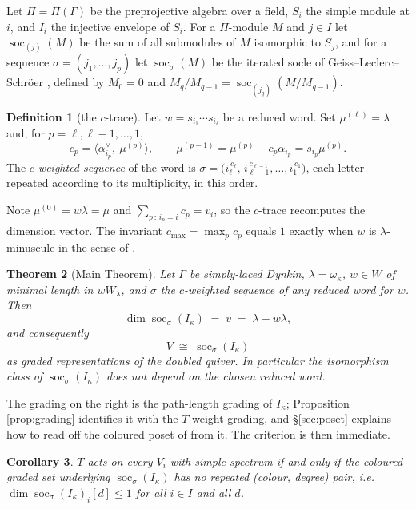 \documentclass[11pt,reqno]{amsart}
\theoremstyle{plain}
\newtheorem{theorem}{Theorem}[section]
\newtheorem{corollary}[theorem]{Corollary}
\theoremstyle{definition}
\newtheorem{definition}[theorem]{Definition}
\DeclareMathOperator{\soc}{soc}
\newcommand{\Pia}{\Pi}
\newcommand{\dimv}{\underline{\dim}}
\newcommand{\al}{\alpha}
\newcommand{\om}{\omega}
\newcommand{\la}{\lambda}
\newcommand{\ka}{\kappa}
\begin{document}
Let $\Pia=\Pia(\Gamma)$ be the preprojective algebra over a field, $S_i$ the
simple module at $i$, and $I_i$ the injective envelope of $S_i$.  For a
$\Pia$-module $M$ and $j\in I$ let $\soc_{(j)}(M)$ be the sum of all submodules
of $M$ isomorphic to $S_j$, and for a sequence $\sigma=(j_1,\dots,j_p)$ let
$\soc_\sigma(M)$ be the iterated socle of Geiss--Leclerc--Schr\"oer
\cite[\S2.4]{GLS}, defined by $M_0=0$ and
$M_q/M_{q-1}=\soc_{(j_q)}(M/M_{q-1})$.

\begin{definition}[the $c$-trace]\label{def:ctrace}
Let $w=s_{i_1}\cdots s_{i_\ell}$ be a reduced word.  Set $\mu^{(\ell)}=\la$ and,
for $p=\ell,\ell-1,\dots,1$,
\[
  c_p=\langle \al_{i_p}^\vee,\ \mu^{(p)}\rangle,
  \qquad
  \mu^{(p-1)}=\mu^{(p)}-c_p\al_{i_p}=s_{i_p}\mu^{(p)} .
\]
The \emph{$c$-weighted sequence} of the word is
$\sigma=\bigl(i_\ell^{\,c_\ell},\,i_{\ell-1}^{\,c_{\ell-1}},\dots,
i_1^{\,c_1}\bigr)$, each letter repeated according to its multiplicity, in
this order.
\end{definition}

Note $\mu^{(0)}=w\la=\mu$ and $\sum_{p\,:\,i_p=i}c_p=v_i$, so the $c$-trace
recomputes the dimension vector.  The invariant $c_{\max}=\max_p c_p$ equals
$1$ exactly when $w$ is $\la$-minuscule in the sense of
\cite[Def.~5.1]{DKK}.

\begin{theorem}[Main Theorem]\label{thm:main}
Let $\Gamma$ be simply-laced Dynkin, $\la=\om_\ka$, $w\in W$ of minimal length
in $wW_\la$, and $\sigma$ the $c$-weighted sequence of any reduced word for
$w$.  Then
\[
   \dimv \soc_\sigma\!\left(I_\ka\right)\;=\;v\;=\;\la-w\la,
\]
and consequently
\[
   V\;\cong\;\soc_\sigma\!\left(I_\ka\right)
\]
as graded representations of the doubled quiver.  In particular the
isomorphism class of $\soc_\sigma(I_\ka)$ does not depend on the chosen
reduced word.
\end{theorem}

The grading on the right is the path-length grading of $I_\ka$; Proposition
\ref{prop:grading} identifies it with the $T$-weight grading, and \S\ref{sec:poset}
explains how to read off the coloured poset of \cite[\S5.4]{DKK} from it.  The
criterion is then immediate.

\begin{corollary}\label{cor:crit}
$T$ acts on every $V_i$ with simple spectrum if and only if the coloured graded
set underlying $\soc_\sigma(I_\ka)$ has no repeated (colour, degree) pair,
i.e.\ $\dim \soc_\sigma(I_\ka)_i[d]\le 1$ for all $i\in I$ and all $d$.
\end{corollary}
\end{document}
